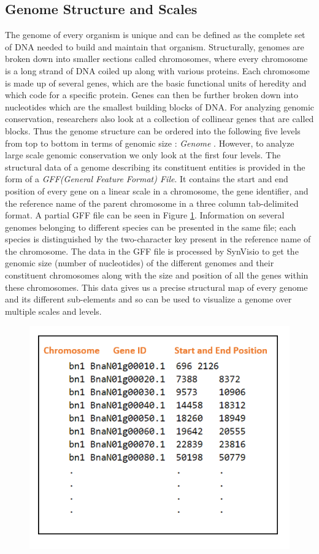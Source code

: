 \subsection{Genome Structure and Scales}
The genome of every organism is unique and can be defined as the complete set of DNA needed to build and maintain that organism. Structurally, genomes are broken down into smaller sections called chromosomes, where every chromosome is a long strand of DNA coiled up along with various proteins. Each chromosome is made up of several genes, which are the basic functional units of heredity and which code for a specific protein. Genes can then be further broken down into nucleotides which are the smallest building blocks of DNA. For analyzing genomic conservation, researchers also look at a collection of collinear genes that are called blocks. Thus the genome structure can be ordered into the following five levels from top to bottom in terms of genomic size : \textit{Genome }. However, to analyze large scale genomic conservation we only look at the first four levels. The structural data of a genome describing its constituent entities is provided in the form of a \textit{GFF(General Feature Format) File}. It contains the start and end position of every gene on a linear scale in a chromosome, the gene identifier, and the reference name of the parent chromosome in a three column tab-delimited format. A partial GFF file can be seen in Figure \ref{fig:ch_3_gff_file}.  Information on several genomes belonging to different species can be presented in the same file; each species is distinguished by the two-character key present in the reference name of the chromosome. The data in the GFF file is processed by SynVisio to get the genomic size (number of nucleotides) of the different genomes and their constituent chromosomes along with the size and position of all the genes within these chromosomes. This data gives us a precise structural map of every genome and its different sub-elements and so can be used to visualize a genome over multiple scales and levels.

\begin{figure}
  \centering
  \includegraphics[width=.55\linewidth]{images/ch_3_gff_file.PNG}
  \label{fig:ch_3_gff_file}
\end{figure}


